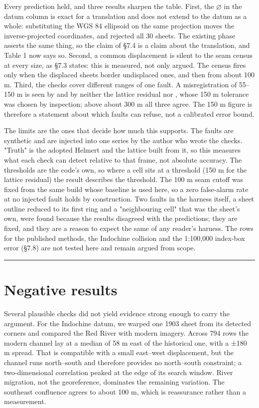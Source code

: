 \documentclass[11pt,a4paper]{article}
\begin{document}
Every prediction held, and three results sharpen the table. First, the \ensuremath{\varnothing} in the datum column is exact for a translation and does not extend to the datum as a whole: substituting the WGS 84 ellipsoid on the same projection moves the inverse-projected coordinates, and \texttt{} rejected all 30 sheets. The existing \texttt{} phase asserts the same thing, so the claim of §7.4 is a claim about the translation, and Table 1 now says so. Second, a common displacement is silent to the seam census at every size, as §7.3 states: this is measured, not only argued. The census fires only when the displaced sheets border undisplaced ones, and then from about 100 m. Third, the checks cover different ranges of one fault. A misregistration of 55–150 m is seen by \texttt{} and by neither the lattice residual nor \texttt{}, whose 150 m tolerance was chosen by inspection; above about 300 m all three agree. The 150 m figure is therefore a statement about which faults \texttt{} can refuse, not a calibrated error bound.

The limits are the ones that decide how much this supports. The faults are synthetic and are injected into one series by the author who wrote the checks. "Truth" is the adopted Helmert and the lattice built from it, so this measures what each check can detect relative to that frame, not absolute accuracy. The thresholds are the code's own, so where a cell sits at a threshold (150 m for the lattice residual) the result describes the threshold. The 100 m seam cutoff was fixed from the same build whose baseline is used here, so a zero false-alarm rate at no injected fault holds by construction. Two faults in the harness itself, a sheet outline reduced to its first ring and a "neighbouring cell" that was the sheet's own, were found because the results disagreed with the predictions; they are fixed, and they are a reason to expect the same of any reader's harness. The rows for the published methods, the Indochine collision and the 1:100,000 index-box error (§7.8) are not tested here and remain argued from scope.

\bigskip\hrule\bigskip

\section{Negative results}

Several plausible checks did not yield evidence strong enough to carry the argument. For the Indochine datum, we warped one 1903 sheet from its detected corners and compared the Red River with modern imagery. Across 794 rows the modern channel lay at a median of 58 m east of the historical one, with a ±180 m spread. That is compatible with a small east–west displacement, but the channel runs north–south and therefore provides no north–south constraint; a two-dimensional correlation peaked at the edge of its search window. River migration, not the georeference, dominates the remaining variation. The southeast confluence agrees to about 100 m, which is reassurance rather than a measurement.
\end{document}
